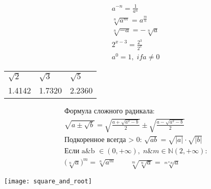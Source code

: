 \documentclass[10pt,a4paper]{scrartcl}
\begin{document}
	\begin{minipage}{0.25\linewidth}\noindent 
		\begin{align*}
		& a^{-n} = \frac {1}{a^n} \\
		& \sqrt[n]{a^m} = a ^ {\frac {m}{n}} \\
		& \sqrt[n]{-a} = -\sqrt[n]{a} \\
		& 2^{x-3} = \frac {2^3}{2^x} \\
		& a^0 = 1,\; if a \neq 0
		\end{align*}
		\begin{tabular}{lll}
		$\sqrt{2}$ & $\sqrt{3}$ & $\sqrt{5}$ \\
		1.4142                    & 1.7320                    & 2.2360                   
		\end{tabular}
	\end{minipage}
	\hfill
	\begin{minipage}{0.40\linewidth}\noindent 
		\begin{align*}
		& \text{Формула сложного радикала:} \\
		& \sqrt{a\pm \sqrt{b}} = 
			    \sqrt{\frac{
			            a + \sqrt{a^2-b}
			                }
			                {2}
			        } \pm 
			        \sqrt{\frac{
			            a - \sqrt{a^2-b}
			                }
			                {2}
			        }\\[6pt]
		& \text{Подкоренное всегда > 0: }\sqrt{ab} = \sqrt{| a |} \cdot \sqrt{|b|} \\[6pt]
		& \text{Если a\&b }  \in (0, +\infty), \; n\&m \in \mathbb {N}(2, +\infty) \text{:} \\
		& \big( \sqrt[n]{a}\big)^m = \sqrt[n]{a^m} \qquad \sqrt[m]{\sqrt[n]{a}} = \sqrt[m * n]{a}
		\end{align*}
	\end{minipage}
	\hfill
	\begin{minipage}{0.25\linewidth}\noindent
		\texttt{[image: square\_and\_root]}
	\end{minipage}
	
\end{document}
